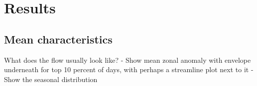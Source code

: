 \section{Results}

\subsection{Mean characteristics}

What does the flow usually look like?
- Show mean zonal anomaly with envelope underneath for top 10 percent of days, with perhaps a streamline plot next to it
- Show the seasonal distribution



